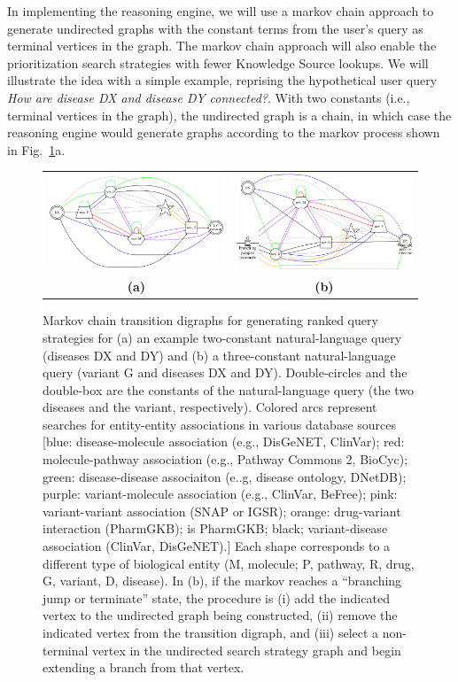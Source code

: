 \documentclass[11pt,notitlepage]{article}
\begin{document}
In implementing the reasoning engine, we will use a markov chain approach to
generate undirected graphs with the constant terms from the user's query as
terminal vertices in the graph. The markov chain approach will also enable the
prioritization search strategies with fewer Knowledge Source lookups.  We will
illustrate the idea with a simple example, reprising the hypothetical user query
{\em How are disease DX and disease DY connected?}. With two constants (i.e.,
terminal vertices in the graph), the undirected graph is a chain, in which case
the reasoning engine would generate graphs according to the markov process
shown in Fig.~\ref{fig:mp}a.
\begin{figure}[h!]
  \begin{tabular}{cc}
    \includegraphics[width=3in]{markov1.png} &
    \includegraphics[width=3in]{markov2.png} \\
                    {\bf (a)} & {\bf (b)}
  \end{tabular}
  \caption{Markov chain transition digraphs for generating ranked query
    strategies for (a) an example two-constant natural-language query (diseases
    DX and DY) and (b) a three-constant natural-language query (variant G and
    diseases DX and DY). Double-circles and the double-box are the constants of
    the natural-language query (the two diseases and the variant, respectively).
    Colored arcs represent searches for entity-entity associations in various
    database sources [blue: disease-molecule association (e.g., DisGeNET,
      ClinVar); red: molecule-pathway association (e.g., Pathway Commons 2,
      BioCyc); green: disease-disease associaiton (e..g, disease ontology,
      DNetDB); purple: variant-molecule association (e.g., ClinVar, BeFree);
      pink: variant-variant association (SNAP or IGSR); orange: drug-variant
      interaction (PharmGKB); is PharmGKB; black; variant-disease association
      (ClinVar, DisGeNET).] Each shape corresponds to a different type of
    biological entity (M, molecule; P, pathway, R, drug, G, variant, D,
    disease). In (b), if the markov reaches a ``branching jump or terminate''
    state, the procedure is (i) add the indicated vertex to the undirected graph
    being constructed, (ii) remove the indicated vertex from the transition
    digraph, and (iii) select a non-terminal vertex in the undirected search
    strategy graph and begin extending a branch from that vertex.}
  \label{fig:mp}    
\end{figure}
\end{document}
